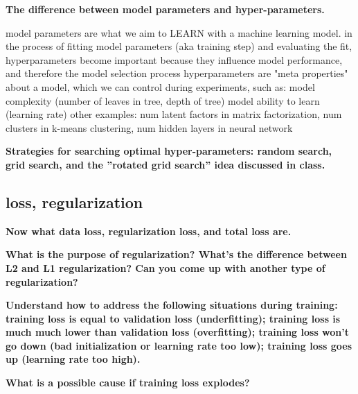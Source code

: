 \documentclass[10pt,letterpaper]{article}
\begin{document}
\subitem \textbf{ The difference between model parameters and hyper-parameters.}
\begin{solution}
model parameters are what we aim to LEARN with a machine learning model. in the process of fitting model parameters (aka training step) and evaluating the fit, hyperparameters become important because they influence model performance, and therefore the model selection process 
\newline
hyperparameters are "meta properties" about a model, which we can control during experiments, such as:
\subitem model complexity (number of leaves in tree, depth of tree)
\subitem model ability to learn (learning rate)
\subitem other examples: num latent factors in matrix factorization, num clusters in k-means clustering, num hidden layers in neural network
\end{solution}
\subitem \textbf{ Strategies for searching optimal hyper-parameters: random search, grid search, and the ”rotated grid search” idea discussed in class.}
\begin{solution}
\end{solution}


\subsection{loss, regularization}

\subitem \textbf{ Now what data loss, regularization loss, and total loss are.}
\begin{solution}
\end{solution}

\subitem \textbf{ What is the purpose of regularization? What’s the difference between L2 and L1 regularization? Can you come up with another type of regularization?}
\begin{solution}
\end{solution}

\subitem \textbf{ Understand how to address the following situations during training: training loss is equal to validation loss (underfitting); training loss is much much lower than validation loss (overfitting); training loss won’t go down (bad initialization or learning rate too low); training loss goes up (learning rate too high).}
\begin{solution}
\end{solution}

\subitem \textbf{ What is a possible cause if training loss explodes?}
\begin{solution}
\end{solution}
\end{document}
